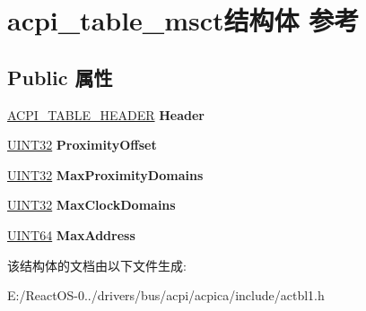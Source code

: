\hypertarget{structacpi__table__msct}{}\section{acpi\+\_\+table\+\_\+msct结构体 参考}
\label{structacpi__table__msct}
\subsection*{Public 属性}
\begin{DoxyCompactItemize}
\item 
\mbox{\label{structacpi__table__msct_a835cc29b81a721356b84078212befb0a}} 
\hyperlink{structacpi__table__header}{A\+C\+P\+I\+\_\+\+T\+A\+B\+L\+E\+\_\+\+H\+E\+A\+D\+ER} {\bfseries Header}
\item 
\mbox{\label{structacpi__table__msct_afa19f5e7064e9208719bf9ae9b900512}} 
\hyperlink{_processor_bind_8h_ae1e6edbbc26d6fbc71a90190d0266018}{U\+I\+N\+T32} {\bfseries Proximity\+Offset}
\item 
\mbox{\label{structacpi__table__msct_affac3fac9f6e9c32bfbd882dcc62cd7d}} 
\hyperlink{_processor_bind_8h_ae1e6edbbc26d6fbc71a90190d0266018}{U\+I\+N\+T32} {\bfseries Max\+Proximity\+Domains}
\item 
\mbox{\label{structacpi__table__msct_a9c91df0478c22b70037cff148e5e1090}} 
\hyperlink{_processor_bind_8h_ae1e6edbbc26d6fbc71a90190d0266018}{U\+I\+N\+T32} {\bfseries Max\+Clock\+Domains}
\item 
\mbox{\label{structacpi__table__msct_a63eeca746993439af2ee887528c64cfa}} 
\hyperlink{_processor_bind_8h_a57be03562867144161c1bfee95ca8f7c}{U\+I\+N\+T64} {\bfseries Max\+Address}
\end{DoxyCompactItemize}


该结构体的文档由以下文件生成\+:\begin{DoxyCompactItemize}
\item 
E\+:/\+React\+O\+S-\/0../drivers/bus/acpi/acpica/include/actbl1.\+h\end{DoxyCompactItemize}
